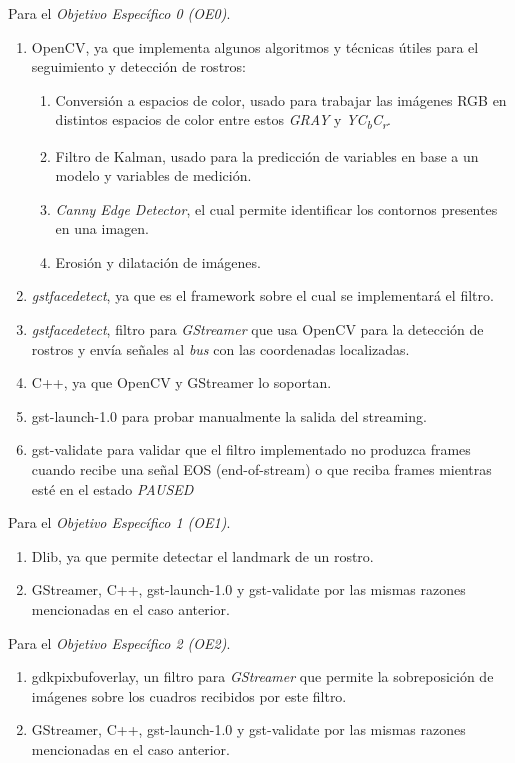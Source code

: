 \documentclass[a4paper,openright,12pt]{report}
\begin{document}
Para el \textit{Objetivo Específico 0 (OE0)}.\\
\begin{enumerate}
    \item OpenCV, ya que implementa algunos algoritmos y técnicas
        útiles para el seguimiento y detección de rostros:
    \begin{enumerate}
        \item Conversión a espacios de color, usado para trabajar las imágenes
            RGB en distintos espacios de color entre estos \textit{GRAY} y
            \textit{YC\textsubscript{b}C\textsubscript{r}}.            
        \item Filtro de Kalman, usado para la predicción de variables en base
            a un modelo y variables de medición.
        \item \textit{Canny Edge Detector}, el cual permite identificar los
            contornos presentes en una imagen.
        \item Erosión y dilatación de imágenes.
    \end{enumerate} 
    \item \textit{gstfacedetect}, ya que es el framework sobre el cual se
        implementará el filtro.
    \item \textit{gstfacedetect}, filtro para \textit{GStreamer} que usa OpenCV
        para la detección de rostros y envía señales al \textit{bus} con las
        coordenadas localizadas.
    \item C++, ya que OpenCV y GStreamer lo soportan.
    \item gst-launch-1.0 para probar manualmente la salida del streaming.
    \item gst-validate para validar que el filtro implementado no produzca
        frames cuando recibe una señal EOS (end-of-stream) o que reciba frames
        mientras esté en el estado \textit{PAUSED}
\end{enumerate}

Para el \textit{Objetivo Específico 1 (OE1)}.\\
\begin{enumerate}
    \item Dlib, ya que permite detectar el landmark de un rostro.
    \item GStreamer, C++, gst-launch-1.0 y gst-validate por las mismas razones
        mencionadas en el caso anterior.
\end{enumerate}

Para el \textit{Objetivo Específico 2 (OE2)}.\\
\begin{enumerate}
    \item {gdkpixbufoverlay}, un filtro para \textit{GStreamer} que permite la
        sobreposición de imágenes sobre los cuadros recibidos por este filtro.
    \item GStreamer, C++, gst-launch-1.0 y gst-validate por las mismas razones
        mencionadas en el caso anterior.
\end{enumerate}
\end{document}
